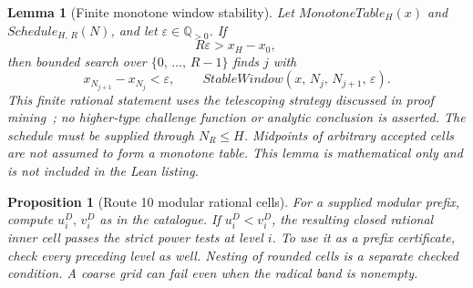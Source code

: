 \documentclass[11pt,reqno]{amsart}
\makeatletter
\newcommand{\Q}{\mathbb Q}
\theoremstyle{blueplain}
\newtheorem{lemma}{Lemma}[section]
\newtheorem{proposition}{Proposition}[section]
\newcounter{type}
\newcounter{asser}
\newcommand{\defref}[1]{\hyperref[#1]{Definition~\ref*{#1}}}
\providecommand{\comma}{\allowbreak,\,}
\numberwithin{equation}{section}
\DeclareRobustCommand{\defref}[1]{%
  \hyperlink{def:#1}{\ensuremath{\csname PredicateName@#1\endcsname}}}
\def\defref#1{#1}%
\def\hyperlink#1#2{#2}}
\makeatother
\begin{document}
\begin{lemma}[Finite monotone window stability]\label{fin:lem:finite-stability}
Let \(\defref{MonotoneTable}_H(x)\) and
\(\defref{Schedule}_{H\comma R}(N)\), and let \(\varepsilon\in\Q_{>0}\).
If
\[
R\varepsilon>x_H-x_0\comma
\]
then bounded search over \(\{0\comma\ldots\comma R-1\}\) finds \(j\) with
\[
x_{N_{j+1}}-x_{N_j}<\varepsilon\comma\qquad
\defref{StableWindow}(x\comma N_j\comma N_{j+1}\comma\varepsilon).
\]
This finite rational statement uses the telescoping strategy discussed
in proof mining~\cite{AvigadGerhardyTowsner2010}; no higher-type challenge
function or analytic conclusion is asserted. The schedule must be supplied
through \(N_R\le H\). Midpoints of arbitrary accepted cells are not
assumed to form a monotone table. This lemma is mathematical only and is
not included in the Lean listing.
\end{lemma}



\begin{proposition}[Route 10 modular rational cells]\label{prop:mod-cell}
For a supplied modular prefix, compute \(u_i^D\comma v_i^D\) as in the
catalogue. If \(u_i^D<v_i^D\), the resulting closed rational inner cell
passes the strict power tests at level \(i\). To use it as a prefix
certificate, check every preceding level as well. Nesting of rounded
cells is a separate checked condition. A coarse grid can fail even
when the radical band is nonempty.
\end{proposition}
\end{document}

